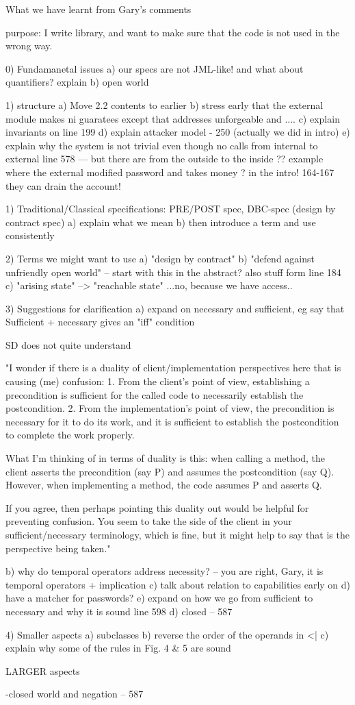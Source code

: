 

What we have learnt from Gary's comments

purpose: I write library, and want to make sure that the code is not used in the wrong way.

0) Fundamanetal issues
a) our specs are not JML-like! and what about quantifiers? explain
b) open world

1) structure
a) Move 2.2 contents to earlier
b) stress early that the external module makes ni guaratees except that addresses unforgeable and ....
c) explain invariants on line 199
d) explain attacker model - 250 (actually we did in intro)
e) explain why the system is not trivial even though no calls from internal to external line 578
   --- but there are from the outside to the inside
   ?? example where the external modified password and takes money ? in the intro!
   164-167 they can drain the account!

1) Traditional/Classical specifications: PRE/POST spec, DBC-spec (design by contract spec)
a) explain what we mean
b) then introduce a term and use consistently

2) Terms we might want to use
a) "design by contract"
b) "defend against unfriendly open world" -- start with this in the abstract?
     also stuff form line 184
c) "arising state" --> "reachable state" ...no, because we have access..

3) Suggestions for clarification
a) expand on necessary and sufficient, eg say that Sufficient + necessary gives an "iff" condition

SD does not quite understand 

"I wonder if there is a duality of client/implementation perspectives here that is causing (me) confusion:
1. From the client's point of view, establishing a precondition is sufficient for the called code to necessarily establish the postcondition.
2. From the implementation's point of view, the precondition is necessary for it to do its work, and it is sufficient to establish the postcondition to complete the work properly.

What I'm thinking of in terms of duality is this: when calling a method, the client asserts the precondition (say P) and assumes the postcondition (say Q). However, when implementing a method, the code assumes P and asserts Q.

If you agree, then perhaps pointing this duality out would be helpful for preventing confusion.  You seem to take the side of the client in your sufficient/necessary terminology, which is fine, but it might help to say that is the perspective being taken."

b) why do temporal operators address necessity? -- you are right, Gary, it is temporal operators + implication
c) talk about relation to capabilities early on
d) have a matcher for passwords? 
e) expand on how we go from sufficient to necessary and why it is sound line 598
d) closed -- 587


4) Smaller aspects
a) subclasses
b) reverse the order of the operands in <| 
c) explain why some of the rules in Fig. 4 & 5 are sound


LARGER aspects

-closed world and negation -- 587

